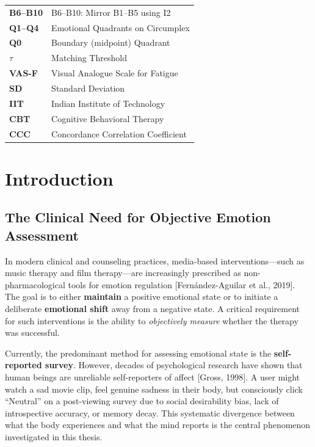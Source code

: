 \documentclass[11pt, a4paper]{report}
\begin{document}
\begin{small}
\begin{tabular}{@{}ll@{}}
\textbf{B6--B10} & B6--B10: Mirror B1--B5 using I2 \\
\textbf{Q1--Q4} & Emotional Quadrants on Circumplex \\
\textbf{Q0} & Boundary (midpoint) Quadrant \\
\textbf{$\tau$} & Matching Threshold \\
\textbf{VAS-F} & Visual Analogue Scale for Fatigue \\
\textbf{SD} & Standard Deviation \\
\textbf{IIT} & Indian Institute of Technology \\
\textbf{CBT} & Cognitive Behavioral Therapy \\
\textbf{CCC} & Concordance Correlation Coefficient \\
\end{tabular}
\end{small}
\cleardoublepage




\chapter{Introduction}
\label{chap:intro}

\section{The Clinical Need for Objective Emotion Assessment}
In modern clinical and counseling practices, media-based interventions---such as music therapy and film therapy---are increasingly prescribed as non-pharmacological tools for emotion regulation [Fern\'{a}ndez-Aguilar et al., 2019]. The goal is to either \textbf{maintain} a positive emotional state or to initiate a deliberate \textbf{emotional shift} away from a negative state. A critical requirement for such interventions is the ability to \emph{objectively measure} whether the therapy was successful.

Currently, the predominant method for assessing emotional state is the \textbf{self-reported survey}. However, decades of psychological research have shown that human beings are unreliable self-reporters of affect [Gross, 1998]. A user might watch a sad movie clip, feel genuine sadness in their body, but consciously click ``Neutral'' on a post-viewing survey due to social desirability bias, lack of introspective accuracy, or memory decay. This systematic divergence between what the body experiences and what the mind reports is the central phenomenon investigated in this thesis.
\end{document}
